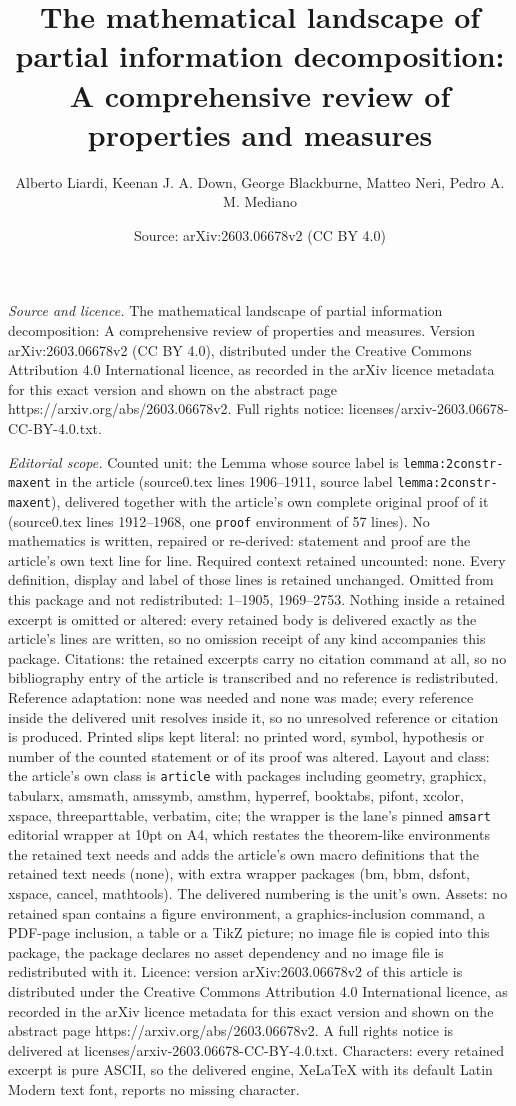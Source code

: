 \documentclass[10pt,a4paper]{amsart}
\title[The mathematical landscape of partial information decomposit]{The mathematical landscape of partial information decomposition: A comprehensive review of properties and measures}
\author{Alberto Liardi, Keenan J. A. Down, George Blackburne, Matteo Neri, Pedro A. M. Mediano}
\date{Source: arXiv:2603.06678v2 (CC BY 4.0)}
\begin{document}
\maketitle

\noindent\emph{Source and licence.} The mathematical landscape of partial information decomposition: A comprehensive review of properties and measures. Version arXiv:2603.06678v2 (CC BY 4.0), distributed under the Creative Commons Attribution 4.0 International licence, as recorded in the arXiv licence metadata for this exact version and shown on the abstract page https://arxiv.org/abs/2603.06678v2. Full rights notice: licenses/arxiv-2603.06678-CC-BY-4.0.txt.\par\smallskip

\noindent\textit{Editorial scope.} Counted unit: the Lemma whose source label is \texttt{lemma:2constr-maxent} in the article (source0.tex lines 1906--1911, source label \texttt{lemma:2constr-maxent}), delivered together with the article's own complete original proof of it (source0.tex lines 1912--1968, one \texttt{proof} environment of 57 lines). No mathematics is written, repaired or re-derived: statement and proof are the article's own text line for line. Required context retained uncounted: none. Every definition, display and label of those lines is retained unchanged. Omitted from this package and not redistributed: 1--1905, 1969--2753. Nothing inside a retained excerpt is omitted or altered: every retained body is delivered exactly as the article's lines are written, so no omission receipt of any kind accompanies this package. Citations: the retained excerpts carry no citation command at all, so no bibliography entry of the article is transcribed and no reference is redistributed. Reference adaptation: none was needed and none was made; every reference inside the delivered unit resolves inside it, so no unresolved reference or citation is produced. Printed slips kept literal: no printed word, symbol, hypothesis or number of the counted statement or of its proof was altered. Layout and class: the article's own class is \texttt{article} with packages including geometry, graphicx, tabularx, amsmath, amssymb, amsthm, hyperref, booktabs, pifont, xcolor, xspace, threeparttable, verbatim, cite; the wrapper is the lane's pinned \texttt{amsart} editorial wrapper at 10pt on A4, which restates the theorem-like environments the retained text needs and adds the article's own macro definitions that the retained text needs (none), with extra wrapper packages (bm, bbm, dsfont, xspace, cancel, mathtools). The delivered numbering is the unit's own. Assets: no retained span contains a figure environment, a graphics-inclusion command, a PDF-page inclusion, a table or a TikZ picture; no image file is copied into this package, the package declares no asset dependency and no image file is redistributed with it. Licence: version arXiv:2603.06678v2 of this article is distributed under the Creative Commons Attribution 4.0 International licence, as recorded in the arXiv licence metadata for this exact version and shown on the abstract page https://arxiv.org/abs/2603.06678v2. A full rights notice is delivered at licenses/arxiv-2603.06678-CC-BY-4.0.txt. Characters: every retained excerpt is pure ASCII, so the delivered engine, XeLaTeX with its default Latin Modern text font, reports no missing character.
\end{document}
